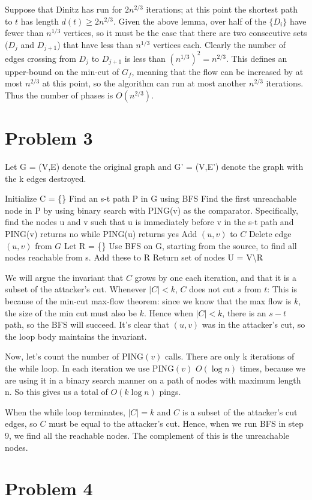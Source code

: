 \documentclass{article}
\begin{document}
Suppose that Dinitz has run for $2n^{2/3}$ iterations; at this point the 
shortest path to $t$ has length $d(t)\geq 2n^{2/3}$. 
Given the above lemma, over half of the $\{D_i\}$ have fewer than
$n^{1/3}$ vertices, so it must be the case that there are two consecutive sets
($D_j$ and $D_{j+1}$) that have less than $n^{1/3}$ vertices each.
Clearly the number of edges crossing from $D_j$ to $D_{j+1}$ is less than $(n^{1/3})^2 = n^{2/3}$.
This defines an upper-bound on the min-cut of $G_f$, meaning that the flow
can be increased by at most $n^{2/3}$ at this point, so 
the algorithm can run at most another $n^{2/3}$ iterations. Thus the number
of phases is $O(n^{2/3})$.

\section*{Problem 3}

Let G = (V,E) denote the original graph and G' = (V,E') denote the graph with the k edges destroyed.
\begin{algorithm}[H]
\caption{}
\begin{algorithmic}[1]
\State Initialize C = \{\}
\State Find an s-t path P in G using BFS
\State Find the first unreachable node in P by using binary search with PING(v) as the comparator. Specifically, find the nodes u and v such that u is immediately before v in the s-t path and PING(v) returns no while PING(u) returns yes
\State Add $(u,v)$ to $C$
\State Delete edge $(u,v)$ from $G$
\EndWhile
\State Let R = \{\}
\State Use BFS on G, starting from the source, to find all nodes reachable from s. Add these to R
\State Return set of nodes U = V\textbackslash R
\end{algorithmic}
\end{algorithm}

We will argue the invariant that $C$ grows by one each iteration, and that it
is a subset of the attacker's cut. Whenever $|C| < k$, $C$ does not cut $s$
from $t$: This is because of the min-cut max-flow theorem: since we know that
the max flow is $k$, the size of the min cut must also be $k$. Hence when $|C| <
k$, there is an $s-t$ path, so the BFS will succeed. It's clear that $(u, v)$
was in the attacker's cut, so the loop body maintains the invariant.

Now, let's count the number of PING$(v)$ calls.  There are only k iterations of
the while loop.  In each iteration we use PING$(v)$ $O(\log n)$ times, because we
are using it in a binary search manner on a path of nodes with maximum length
n. So this gives us a total of $O(k \log n)$ pings.

When the while loop terminates, $|C| = k$ and $C$ is a subset of the attacker's
cut edges, so $C$ must be equal to the attacker's cut. Hence, when we run BFS
in step 9, we find all the reachable nodes. The complement of this is the
unreachable nodes.

\section*{Problem 4}
\end{document}
